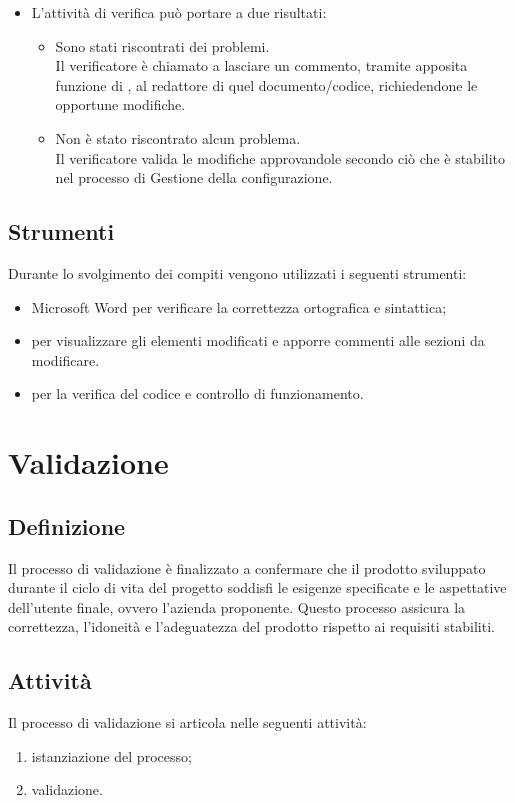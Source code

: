 \begin{itemize}
\begin{itemize}
    \end{itemize}
    \item L'attività di verifica può portare a due risultati:
    \begin{itemize}
        \item Sono stati riscontrati dei problemi.\\
        Il verificatore è chiamato a lasciare un commento, tramite apposita funzione di , al redattore di quel documento/codice, richiedendone le opportune modifiche.
        \item Non è stato riscontrato alcun problema.\\
        Il verificatore valida le modifiche approvandole secondo ciò che è stabilito nel processo di Gestione della configurazione.
    \end{itemize}
\end{itemize}

\subsection{Strumenti}
Durante lo svolgimento dei compiti vengono utilizzati i seguenti strumenti:
\begin{itemize}
    \item Microsoft Word per verificare la correttezza ortografica e sintattica;
    \item {} per visualizzare gli elementi modificati e apporre commenti alle sezioni da modificare.
    \item {}per la verifica del codice e controllo di funzionamento.
\end{itemize}
\newpage

\section{Validazione} \label{sec:validazione}
\subsection{Definizione}
Il processo di validazione è finalizzato a confermare che il prodotto sviluppato durante il ciclo di vita del progetto soddisfi le esigenze specificate e le aspettative dell'utente finale, ovvero l'azienda proponente. Questo processo assicura la correttezza, l'idoneità e l'adeguatezza del prodotto rispetto ai requisiti stabiliti.
\subsection{Attività}
Il processo di validazione si articola nelle seguenti attività:
\begin{enumerate}
    \item istanziazione del processo;
    \item validazione.
\end{enumerate}
